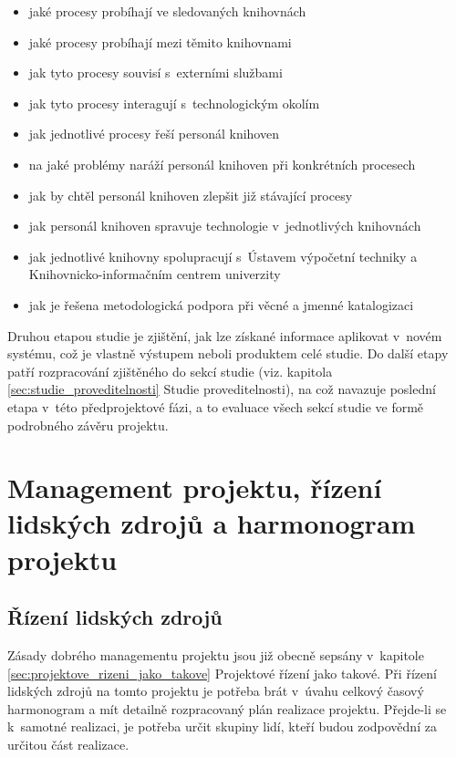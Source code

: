 \documentclass[
	11pt, oneside, printed, final, palatino, monochrome
	microtype,
	table,   %
	lof,     %
	lot     %
]{fithesis3}
\begin{document}
{\begin{itemize}
\item jaké procesy probíhají ve sledovaných knihovnách
\item jaké procesy probíhají mezi těmito knihovnami
\item jak tyto procesy souvisí s~externími službami
\item jak tyto procesy interagují s~technologickým okolím
\item jak jednotlivé procesy řeší personál knihoven
\item na jaké problémy naráží personál knihoven při konkrétních procesech
\item jak by chtěl personál knihoven zlepšit již stávající procesy
\item jak personál knihoven spravuje technologie v~jednotlivých knihovnách
\item jak jednotlivé knihovny spolupracují s~Ústavem výpočetní techniky a Knihovnicko-informačním centrem univerzity
\item jak je řešena metodologická podpora při věcné a jmenné katalogizaci
\end{itemize}

Druhou etapou studie je zjištění, jak lze získané informace aplikovat v~novém systému, což je vlastně výstupem neboli produktem celé studie. Do další etapy patří rozpracování zjištěného do sekcí studie (viz. kapitola \ref{sec:studie_proveditelnosti} Studie proveditelnosti), na což navazuje poslední etapa v~této předprojektové fázi, a to evaluace všech sekcí studie ve formě podrobného závěru projektu.

\section{Management projektu, řízení lidských zdrojů a harmonogram projektu}

\subsection{Řízení lidských zdrojů}

Zásady dobrého managementu projektu jsou již obecně sepsány v~kapitole \ref{sec:projektove_rizeni_jako_takove} Projektové řízení jako takové. Při řízení lidských zdrojů na tomto projektu je potřeba brát v~úvahu celkový časový harmonogram a mít detailně rozpracovaný plán realizace projektu. Přejde-li se k~samotné realizaci, je potřeba určit skupiny lidí, kteří budou zodpovědní za určitou část realizace.

}
\end{document}
